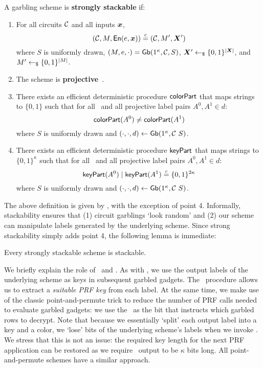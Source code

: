 \begin{definition}\label{def:stackable}
  A garbling scheme is \textbf{strongly stackable} if:
  \begin{enumerate}
    \item
      For
      all circuits $\mathcal C$
      and all inputs $\cirinp$,
      \[
        (\cir, \mat, \gEn(e, \cirinp)) \indist (\cir, \mat', \gcirinp')
      \]
      where
      $S$ is uniformly drawn,
      $(M, e, \cdot) = \textsf{Gb}(1^\kappa, \mathcal C, S)$,
      $\gcirinp' \drawnfrom{} \{0, 1\}^{|\gcirinp|}$,
      and $M' \gets_{\$} \{0, 1\}^{|M|}$.
    \item
      The scheme is \textbf{projective}~\cite{CCS:BelHoaRog12}.
    \item
      There exists an efficient deterministic procedure $\textsf{colorPart}$ that
      maps strings to $\{0, 1\}$ such that for all \cir\ and all
      projective label pairs $A^0, A^1 \in d$:
      \[
        \textsf{colorPart}(A^0) \neq \textsf{colorPart}(A^1)
      \]
      where $S$ is uniformly drawn and $(\cdot, \cdot, d) \gets \textsf{Gb}(1^\kappa, \mathcal C\ S)$.
    \item
      There exists an efficient deterministic procedure $\textsf{keyPart}$ that
      maps strings to $\{0, 1\}^\kappa$ such that for all \cir\ and all
      projective label pairs $A^0, A^1 \in d$:
      \[
        \textsf{keyPart}(A^0) \mid \textsf{keyPart}(A^1) \overset{c}{=} \{0, 1\}^{2\kappa}
      \]
      where $S$ is uniformly drawn and $(\cdot, \cdot, d) \gets \textsf{Gb}(1^\kappa, \mathcal C\ S)$.
  \end{enumerate}
\end{definition}

The above definition is given by \HK, with the exception of point 4.
Informally, stackability ensures that (1) circuit garblings `look
random' and (2) our scheme can manipulate labels generated by the
underlying scheme.
Since strong stackability simply adds point 4, the following lemma is
immediate:
\begin{lemma}\label{lemma:stack-strongstack}
  Every strongly stackable scheme is stackable.
\end{lemma}

We briefly explain the role of \lcolor\ and \lkey. As with \HK, we
use the output labels of the underlying scheme as keys in subsequent
garbled gadgets.  The \lkey\ procedure allows us to extract a
\emph{suitable PRF key} from each label. At the same time, we make use
of the classic point-and-permute trick to reduce the number of PRF calls
needed to evaluate garbled gadgets: we use the \lcolor\ as the bit
that instructs which garbled rows to decrypt.  Note that because we
essentially `split’ each output label into a key and a color, we
`lose’ bits of the underlying scheme’s labels when we invoke
\lkey. We stress that this is not an issue: the required key
length for the next PRF application can be restored as we require
\lkey\ output to be $\kappa$ bits long. All point-and-permute schemes
have a similar approach.

